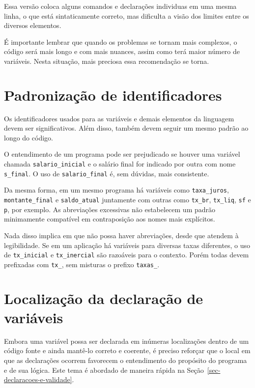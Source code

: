 \documentclass[
  11pt,
  a4paper,
]{scrbook}
\begin{document}
Essa versão coloca alguns comandos e declarações individuas em uma mesma
linha, o que está sintaticamente correto, mas dificulta a visão dos
limites entre os diversos elementos.

É importante lembrar que quando os problemas se tornam mais complexos, o
código será mais longo e com mais nuances, assim como terá maior número
de variáveis. Nesta situação, mais preciosa essa recomendação se torna.

\section{Padronização de
identificadores}\label{padronizauxe7uxe3o-de-identificadores}

Os identificadores usados para as variáveis e demais elementos da
linguagem devem ser significativos. Além disso, também devem seguir um
mesmo padrão ao longo do código.

O entendimento de um programa pode ser prejudicado se houver uma
variável chamada \texttt{salario\_inicial} e o salário final for
indicado por outra com nome \texttt{s\_final}. O uso de
\texttt{salario\_final} é, sem dúvidas, mais consistente.

Da mesma forma, em um mesmo programa há variáveis como
\texttt{taxa\_juros}, \texttt{montante\_final} e \texttt{saldo\_atual}
juntamente com outras como \texttt{tx\_br}, \texttt{tx\_liq},
\texttt{sf} e \texttt{p}, por exemplo. As abreviações excessivas não
estabelecem um padrão minimamente compatível em contraposição aos nomes
mais explícitos.

Nada disso implica em que não possa haver abreviações, desde que atendem
à legibilidade. Se em um aplicação há variáveis para diversas taxas
diferentes, o uso de \texttt{tx\_inicial} e \texttt{tx\_inercial} são
razoáveis para o contexto. Porém todas devem prefixadas com
\texttt{tx\_}, sem misturas o prefixo \texttt{taxas\_}.

\section{Localização da declaração de
variáveis}\label{localizauxe7uxe3o-da-declarauxe7uxe3o-de-variuxe1veis}

Embora uma variável possa ser declarada em inúmeras localizações dentro
de um código fonte e ainda mantê-lo correto e coerente, é preciso
reforçar que o local em que as declarações ocorrem favorecem o
entendimento do propósito do programa e de sua lógica. Este tema é
abordado de maneira rápida na Seção~\ref{sec-declaracoes-e-validade}.
\end{document}
